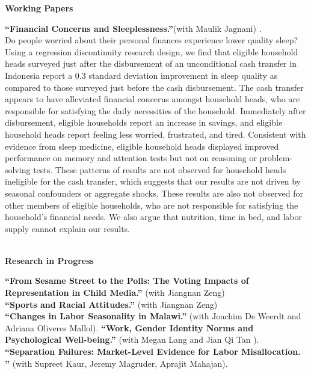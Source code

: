 \documentclass[10pt, oneside]{article}
\begin{document}
\begin{minipage}[t]{0.1\linewidth}
\textbf{Working Papers}
\end{minipage}\hspace{0.05\linewidth}
\begin{minipage}[t]{0.8\linewidth}
\textbf{``Financial Concerns and Sleeplessness.''}(with Maulik Jagnani) \href{https://github.com/claireduq/claireduq.github.io/blob/master/sleep_financial_concerns.pdf}{\color{blue}{Available here}}. \\
Do people worried about their personal finances experience lower quality sleep? Using a regression discontinuity research design, we find that eligible household heads surveyed just after the disbursement of an unconditional cash transfer in Indonesia report a 0.3 standard deviation improvement in sleep quality as compared to those surveyed just before the cash disbursement. The cash transfer appears to have alleviated financial concerns amongst household heads, who are responsible for satisfying the daily necessities of the household. Immediately after disbursement, eligible households report an increase in savings, and eligible household heads report feeling less worried, frustrated, and tired. Consistent with evidence from sleep medicine, eligible household heads displayed improved performance on memory and attention tests but not on reasoning or problem-solving tests. These patterns of results are not observed for household heads ineligible for the cash transfer, which suggests that our results are not driven by seasonal confounders or aggregate shocks. These results are also not observed for other members of eligible households, who are not responsible for satisfying the household's financial needs. We also argue that nutrition, time in bed, and labor supply cannot explain our results.\\~\\
\end{minipage}\vspace{4mm}

\begin{minipage}[t]{0.1\linewidth}
\textbf{Research in Progress}
\end{minipage}\hspace{0.05\linewidth}
\begin{minipage}[t]{0.8\linewidth}
\textbf{``From Sesame Street to the Polls: The Voting Impacts of Representation in Child Media.''} (with Jiangnan Zeng)  \\ 
\textbf{``Sports and Racial Attitudes.''} (with Jiangnan Zeng)  \\ 
\textbf{``Changes in Labor Seasonality in Malawi.''} (with Joachim De Weerdt and Adriana Oliveres Mallol).
\textbf{``Work, Gender Identity Norms and Psychological Well-being.''} (with Megan Lang and Jian Qi Tan ). \\
\textbf{``Separation Failures: Market-Level Evidence for Labor Misallocation. ''} (with Supreet Kaur, Jeremy Magruder, Aprajit Mahajan). \\
\end{minipage}\vspace{4mm} 
\end{document}
